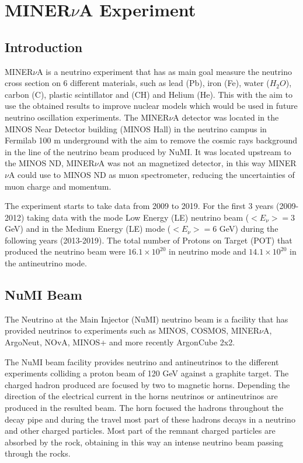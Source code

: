 \chapter{MINER$\nu$A Experiment}
\minitoc
\label{Cap:MnvExperiment}

\section{Introduction}
\label{Chap2:MnvExperiment:Intro}
MINER$\nu$A is a neutrino experiment that has as main goal measure the neutrino cross section on 6 different materials, such as lead (Pb), iron (Fe), water ($H_2O$), carbon (C), plastic scintillator and (CH) and Helium (He). This with the aim to use the obtained results to improve nuclear models which would be used in future neutrino oscillation experiments. The MINER$\nu$A detector was located in the MINOS Near Detector building (MINOS Hall) in the neutrino campus in Fermilab 100 m underground with the aim to remove the cosmic rays background in the line of the neutrino beam produced by NuMI. It was located upstream to the MINOS ND, MINER$\nu$A was not an magnetized detector, in this way MINER$\nu$A could use to MINOS ND as muon spectrometer, reducing the uncertainties of muon charge and momentum.  

The experiment starts to take data from 2009 to 2019. For the first 3 years (2009-2012) taking data with the mode Low Energy (LE) neutrino beam ($<E_\nu>=3$ GeV) and in the Medium Energy (LE) mode ($<E_\nu> = 6$ GeV) during the following years (2013-2019). The total number of Protons on Target (POT) that produced the neutrino beam were $16.1\times10^{20}$ in neutrino mode and $14.1\times10^{20}$ in the antineutrino mode. 

\section{NuMI Beam}
\label{Cap:MnvExperiment:NuMI}
The Neutrino at the Main Injector \cite{Numi} (NuMI) neutrino beam is a facility that has provided neutrinos to experiments such as MINOS\cite{MINOS}, COSMOS\cite{COSMOS}, MINER$\nu$A\cite{MINERvA}, ArgoNeut\cite{ArgoNeuT}, NOvA\cite{NOvA}, MINOS+\cite{MINOS+} and more recently ArgonCube 2x2\cite{twobytwo}.

The NuMI beam facility provides neutrino and antineutrinos to the different experiments colliding a proton beam of 120 GeV against a graphite target. The charged hadron produced are  focused by two to magnetic horns. Depending the direction of the electrical current in the horns neutrinos or antineutrinos are produced in the resulted beam. The horn focused the hadrons throughout the decay pipe and during the travel most part of these hadrons decays in a neutrino and other charged particles. Most part of the remnant charged particles are absorbed by the rock, obtaining in this way an intense neutrino beam passing through the rocks.  

